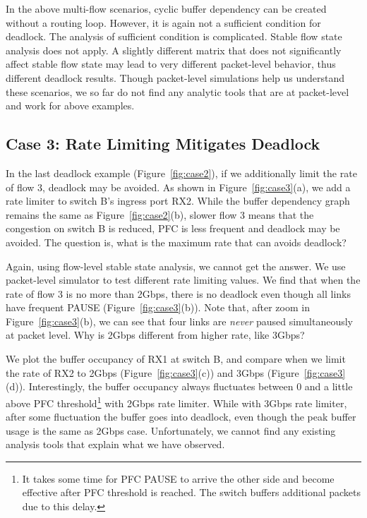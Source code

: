 
In the above multi-flow scenarios, cyclic buffer dependency can be created without
a routing loop. However, it is again not a sufficient condition for deadlock. The analysis of sufficient
condition is complicated. Stable flow state analysis does not apply.
A slightly different matrix that does not significantly affect stable flow state may lead
to very different packet-level behavior, thus different deadlock results.
Though packet-level simulations help us understand these scenarios, we so far do not find
any analytic tools that are at packet-level and work for above examples.

\secspace
\subsection{Case 3: Rate Limiting Mitigates Deadlock}
\secspace

In the last deadlock example (Figure~\ref{fig:case2}), if we additionally limit the rate of flow 3, deadlock
may be avoided.  As shown in Figure~\ref{fig:case3}(a), we add a rate limiter to switch B's
ingress port RX2. While the buffer dependency graph remains the same as Figure~\ref{fig:case2}(b),
slower flow 3 means that the congestion on switch B is reduced, PFC is less
frequent and deadlock may be avoided. The question is, what is the maximum rate that can
avoids deadlock?

Again, using flow-level stable state analysis, we cannot get the answer. We use packet-level simulator
to test different rate limiting values. We find that when the rate of flow 3 is no more than 2Gbps,
there is no deadlock even though all links have frequent PAUSE (Figure~\ref{fig:case3}(b)).
Note that, after zoom in Figure~\ref{fig:case3}(b), we can see that four links are {\em never} paused
simultaneously at packet level. Why is 2Gbps different from higher rate, like 3Gbps?

We plot the buffer occupancy of RX1 at switch B, and compare when we limit the rate of RX2 to 2Gbps
(Figure~\ref{fig:case3}(c)) and 3Gbps (Figure~\ref{fig:case3}(d)). Interestingly, the buffer occupancy
always fluctuates between 0 and a little above PFC threshold\footnote{It takes some time for PFC PAUSE
to arrive the other side and become effective after PFC threshold is reached.
The switch buffers additional packets due to this delay.} with 2Gbps rate limiter. While with 3Gbps rate
limiter, after some fluctuation the buffer goes into deadlock, even though the peak buffer usage is the same
as 2Gbps case. Unfortunately, we cannot find any existing analysis tools that explain
what we have observed.

